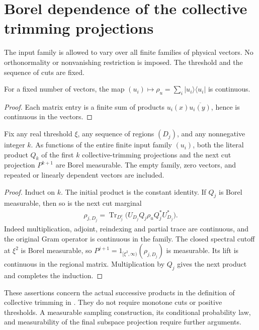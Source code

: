 \section{Borel dependence of the collective trimming projections}

The input family is allowed to vary over all finite families of physical
vectors. No orthonormality or nonvanishing restriction is imposed. The
threshold and the sequence of cuts are fixed.

\begin{theorem}
    \label{thm:continuous_trimming_gram}
    \leanok
    For a fixed number of vectors, the map
    $(u_i)\mapsto\rho_u=\sum_i|u_i\rangle\langle u_i|$ is continuous.
\end{theorem}
\begin{proof}\leanok
    Each matrix entry is a finite sum of products
    $u_i(x)\overline{u_i(y)}$, hence is continuous in the vectors.
\end{proof}

\begin{theorem}
    \label{thm:measurable_collective_trimming}
    \leanok
    Fix any real threshold $\xi$, any sequence of regions $(D_j)$, and
    any nonnegative integer $k$. As functions of the entire finite input
    family $(u_i)$, both the literal product $Q_k$ of the first $k$
    collective-trimming projections and the next cut projection $P^{k+1}$
    are Borel measurable. The empty family, zero vectors, and repeated
    or linearly dependent vectors are included.
\end{theorem}
\begin{proof}\leanok
    Induct on $k$. The initial product is the constant identity.
    If $Q_j$ is Borel measurable, then so is the next cut marginal
    \begin{align}
        \rho_{j,D_j}
        =\operatorname{Tr}_{D_j^c}
        \bigl(U_{D_j}Q_j\rho_u Q_j^*U_{D_j}^*\bigr).
    \end{align}
    Indeed multiplication, adjoint, reindexing and partial trace are
    continuous, and the original Gram operator is continuous in the family.
    The closed spectral cutoff at $\xi^2$ is Borel measurable, so
    $P^{j+1}=1_{[\xi^2,\infty)}(\rho_{j,D_j})$ is measurable.
    Its lift is continuous in the regional matrix. Multiplication by
    $Q_j$ gives the next product and completes the induction.
\end{proof}

These assertions concern the actual successive products in
the definition of collective trimming in
\cite[lines 648--655]{Arad2016RigorousRG}.
They do not require monotone cuts or positive thresholds. A measurable
sampling construction, its conditional probability law, and measurability
of the final subspace projection require further arguments.
